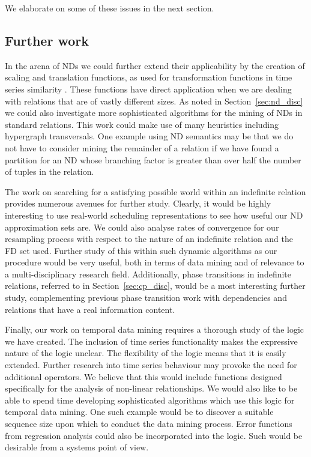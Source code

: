 We elaborate on some of these issues in the next section.

\subsection{Further work}

In the arena of NDs we could further extend their applicability by the
creation of scaling and translation functions, as used for
transformation functions in time series similarity
\cite{alss95}. These functions have direct application when we are
dealing with relations that are of vastly different sizes. As noted in
Section~\ref{sec:nd_disc} we could also investigate more sophisticated
algorithms for the mining of NDs in standard relations. This work
could make use of many heuristics including hypergraph
transversals. One example using ND semantics may be that we do not 
have to consider mining the remainder of a relation if we have found a
partition for an ND whose branching factor is greater than over half
the number of tuples in the relation.
	
\medskip
The work on searching for a satisfying possible world within an
indefinite relation provides numerous avenues for further
study. Clearly, it would be highly interesting to use real-world
scheduling representations to see how useful our ND approximation sets
are. We could also 
analyse rates of convergence for our resampling process with respect to the
nature of an indefinite relation and the FD set
used. Further study of this within
such dynamic algorithms as our procedure would be very useful, both in
terms of data mining and of relevance to a multi-disciplinary research
field. Additionally, phase transitions in indefinite
relations, referred to in Section~\ref{sec:cp_disc}, would be a most
interesting further study, complementing previous 
phase transition work with dependencies and relations that have a real
information content. 

\medskip

Finally, our work on temporal data mining requires a thorough study of
the logic we have created. The inclusion of time series functionality
makes the expressive nature of the logic unclear. The flexibility of
the logic means that it is easily extended. Further
research into time series behaviour may provoke the need for
additional operators. We believe that this would include functions
designed specifically for the analysis of non-linear relationships.
We would also like to
be able to spend time developing sophisticated algorithms which use
this logic for temporal data mining. One such example would be to
discover a suitable sequence size upon which to conduct the data
mining process. Error functions from regression analysis could also be
incorporated into the logic.  Such would be desirable from a 
systems point of view.  

